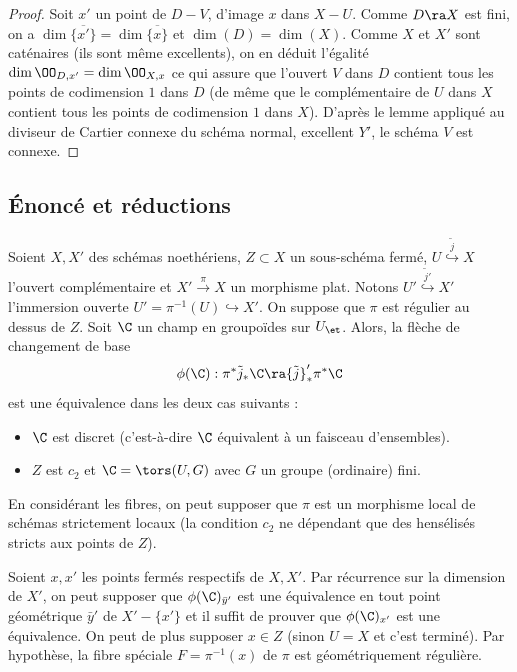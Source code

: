 \documentclass[10pt]{../fichiers-configuration-latex/smfart}
\begin{document}
\begin{proof}
Soit $x'$ un point de $D-V$, d'image $x$ dans $X-U$. Comme $D\ra X$ est fini, on a
$\dim\overline{\{x'\}}=\dim\overline{\{x\}}$ et $\dim(D)=\dim(X)$. Comme $X$ et $X'$ sont caténaires
(ils sont même excellents), on en déduit l'égalité $\dim\OO_{D,x'}=\dim\OO_{X,x}$ ce qui assure que
l'ouvert $V$ dans $D$ contient tous les points de codimension $1$ dans $D$ (de même que  le
complémentaire de $U$ dans $X$ contient tous les points de codimension $1$ dans $X$). D'après le
lemme  appliqué au diviseur de Cartier connexe du schéma normal,
excellent  ${Y'}$, le schéma $V$ est connexe.\end{proof}

\subsection{Énoncé et réductions}

\begin{theoreme2} \label{20rigfaible} Soient $X,X'$ des schémas
noethériens, $Z\subset X$ un sous-schéma fermé, $U\stackrel{{\tilde j}}{\hookrightarrow}X$ l'ouvert
complémentaire et $X'\xrightarrow{\pi} X$ un morphisme plat. Notons $U'\stackrel{{\tilde
j}'}{\hookrightarrow}X'$  l'immersion ouverte $U'=\pi^{-1}(U)\hookrightarrow X'$.  On suppose que
$\pi$ est régulier au dessus de $Z$. Soit $\C$ un champ en groupoïdes sur $U_\et$. Alors, la flèche
de changement de base $$\phi(\C):\pi^*{\tilde j}_*\C\ra {\tilde j}'_*\pi^*\C$$ est une équivalence
dans les deux cas suivants :
\begin{itemize} \item[(i)] $\C$ est discret (c'est-à-dire $\C$
équivalent à un faisceau d'ensembles).  \item[(ii)] $Z$ est $c_2$ et $\C=\tors(U,G)$ avec $G$ un
groupe (ordinaire) fini.
\end{itemize}
\end{theoreme2}

En considérant les fibres, on peut supposer que $\pi$ est un morphisme local de schémas strictement
locaux (la condition $c_2$ ne dépendant que des hensélisés stricts aux points de $Z$).

Soient $x,x'$ les points fermés respectifs de $X,X'$. Par récurrence sur la dimension de $X'$, on
peut supposer que $\phi(\C)_{\bar y'}$ est une équivalence en tout point géométrique $\bar y'$ de
$X'-\{x'\}$ et il suffit de prouver que $\phi(\C)_{x'}$ est une équivalence. On peut de plus
supposer $x\in Z$ (sinon $U=X$ et c'est terminé). Par hypothèse, la fibre spéciale $F=\pi^{-1}(x)$
de $\pi$ est géométriquement régulière.
\end{document}
